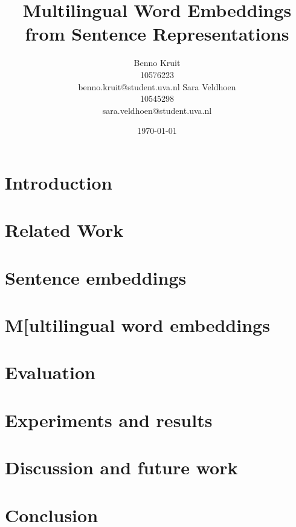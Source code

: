 \documentclass[11pt]{article}
\title{Multilingual Word Embeddings from Sentence Representations}
\author{Benno Kruit\\10576223\\benno.kruit@student.uva.nl\And
Sara Veldhoen\\10545298\\sara.veldhoen@student.uva.nl}
\date{\today}
\begin{document}
\maketitle



\section{Introduction}\label{s:introduction}

\section{Related Work}\label{s:relatedWork}

\section{Sentence embeddings}\label{s:sentenceEmbeddings}

\section{M[ultilingual word embeddings}\label{s:wordEmbeddings}

\section{Evaluation}\label{s:evaluation}

\section{Experiments and results}\label{s:experiments}

\section{Discussion and future work}\label{s:discussion}

\section{Conclusion}\label{s:conclusion}




\end{document}
